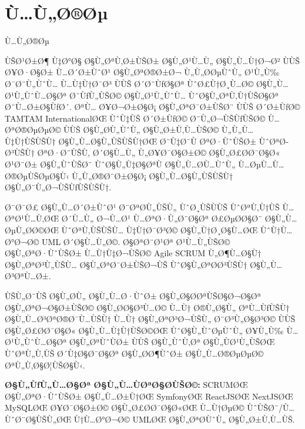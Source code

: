 \documentclass{rapportPFEHIND}
\begin{document}
\section*{Ù…Ù„Ø®Øµ}
\begin{RLtext}

\LARGE{Ù…Ù„Ø®Øµ}
\end{RLtext}
\begin{RLtext}

ÙŠØ¹Ø±Ø¶ Ù‡Ø°Ø§ Ø§Ù„ØªÙ‚Ø±ÙŠØ± Ø§Ù„Ø¹Ù…Ù„ Ø§Ù„Ù…Ù†Ø¬Ø² ÙÙŠ Ø¥Ø·Ø§Ø± Ù…Ø´Ø±ÙˆØ¹ Ø§Ù„ØªØ®Ø±Ø¬ Ù„Ù„Ø­ØµÙˆÙ„ Ø¹Ù„Ù‰ Ø¯Ø¨Ù„ÙˆÙ… Ù…Ù‡Ù†Ø¯Ø³ ÙÙŠ Ø´Ø¨ÙƒØ§Øª ÙˆØ£Ù†Ø¸Ù…Ø© Ø§Ù„Ù…Ø¹Ù„ÙˆÙ…Ø§Øª Ø¨ÙƒÙ„ÙŠØ© Ø§Ù„Ø¹Ù„ÙˆÙ… ÙˆØ§Ù„ØªÙ‚Ù†ÙŠØ§Øª Ø¨Ù…Ø±Ø§ÙƒØ´. ØªÙ… Ø¥Ø¬Ø±Ø§Ø¡ Ø§Ù„ØªØ¯Ø±ÙŠØ¨ ÙÙŠ Ø´Ø±ÙƒØ© TAMTAM InternationalØŒ ÙˆÙ‡ÙŠ Ø´Ø±ÙƒØ© Ø¨Ù„Ø¬ÙŠÙƒÙŠØ© Ù…ØªØ®ØµØµØ© ÙÙŠ Ø§Ù„Ø­Ù„ÙˆÙ„ Ø§Ù„Ø±Ù‚Ù…ÙŠØ© Ù„Ù„Ù…Ù‡Ù†ÙŠÙŠÙ† Ø§Ù„Ù…Ø§Ù„ÙŠÙŠÙ†ØŒ Ø¨Ù‡Ø¯Ù ØªØ·ÙˆÙŠØ± ÙˆØªØ­Ø³ÙŠÙ† ØªØ·Ø¨ÙŠÙ‚ Ø´Ø§Ù…Ù„ Ù„Ø¥Ø¯Ø§Ø±Ø© Ø§Ù„Ø£Ø­Ø¯Ø§Ø« Ø¹Ø¨Ø± Ø§Ù„ÙˆÙŠØ¨ ÙˆØ§Ù„Ù‡Ø§ØªÙ Ø§Ù„Ù…Ø­Ù…ÙˆÙ„ Ù…ØµÙ…Ù… Ø®ØµÙŠØµØ§Ù‹ Ù„Ù„Ø®Ø¨Ø±Ø§Ø¡ Ø§Ù„Ù…Ø§Ù„ÙŠÙŠÙ† Ø§Ù„Ø¨Ù„Ø¬ÙŠÙƒÙŠÙŠÙ†.

Ø¨Ø¯Ø£ Ø§Ù„Ù…Ø´Ø±ÙˆØ¹ Ø¨ØªØ­Ù„ÙŠÙ„ ÙˆØ¸ÙŠÙÙŠ ÙˆØªÙ‚Ù†ÙŠ Ù…ØªØ¹Ù…Ù‚ØŒ Ø´Ù…Ù„ Ø¬Ù…Ø¹ Ù…ØªØ·Ù„Ø¨Ø§Øª Ø£ØµØ­Ø§Ø¨ Ø§Ù„Ù…ØµÙ„Ø­Ø©ØŒ ÙˆØªÙ‚ÙŠÙŠÙ… Ù‡Ù†Ø¯Ø³Ø© Ø§Ù„Ù†Ø¸Ø§Ù…ØŒ ÙˆÙ†Ù…Ø°Ø¬Ø© UML Ø´Ø§Ù…Ù„Ø©. Ø§ØªØ¨Ø¹Øª Ø¹Ù…Ù„ÙŠØ© Ø§Ù„ØªØ·ÙˆÙŠØ± Ù…Ù†Ù‡Ø¬ÙŠØ© Agile SCRUM Ù„Ø¶Ù…Ø§Ù† Ø§Ù„ØªØ³Ù„ÙŠÙ… Ø§Ù„ØªØ¯Ø±ÙŠØ¬ÙŠ ÙˆØ§Ù„ØªØ­Ø³ÙŠÙ† Ø§Ù„Ù…Ø³ØªÙ…Ø±.

ÙŠÙ„Ø¨ÙŠ Ø§Ù„Ø­Ù„ Ø§Ù„Ù…Ø·ÙˆØ± Ø§Ù„Ø§Ø­ØªÙŠØ§Ø¬Ø§Øª Ø§Ù„ØªØ¬Ø§Ø±ÙŠØ© Ø§Ù„Ø­Ø§Ø³Ù…Ø© Ù…Ù† Ø®Ù„Ø§Ù„ ØªÙ…ÙƒÙŠÙ† Ø§Ù„Ù…Ø³ØªØ®Ø¯Ù…ÙŠÙ† Ù…Ù† Ø§Ù„ØªØ³Ø¬ÙŠÙ„ Ø¨Ø³Ù„Ø§Ø³Ø© ÙÙŠ Ø§Ù„Ø£Ø­Ø¯Ø§Ø« Ø§Ù„Ù…Ù‡Ù†ÙŠØ©ØŒ ÙˆØ§Ù„ÙˆØµÙˆÙ„ Ø¥Ù„Ù‰ Ù…Ø¹Ù„ÙˆÙ…Ø§Øª Ø§Ù„ØªÙˆÙØ± ÙÙŠ Ø§Ù„ÙˆÙ‚Øª Ø§Ù„ÙØ¹Ù„ÙŠØŒ ÙˆØªÙ„Ù‚ÙŠ Ø´Ù‡Ø§Ø¯Ø§Øª Ø§Ù„Ø­Ø¶ÙˆØ± Ø§Ù„Ù…Ø®ØµØµØ© ØªÙ„Ù‚Ø§Ø¦ÙŠØ§Ù‹.

\vspace{3cm}
\textbf{Ø§Ù„ÙƒÙ„Ù…Ø§Øª Ø§Ù„Ù…ÙØªØ§Ø­ÙŠØ©:} SCRUMØŒ Ø§Ù„ØªØ·ÙˆÙŠØ± Ø§Ù„Ù…Ø±Ù†ØŒ SymfonyØŒ ReactJSØŒ NextJSØŒ MySQLØŒ Ø¥Ø¯Ø§Ø±Ø© Ø§Ù„Ø£Ø­Ø¯Ø§Ø«ØŒ Ù…Ù†ØµØ© ÙˆÙŠØ¨/Ù…ÙˆØ¨Ø§ÙŠÙ„ØŒ Ù†Ù…Ø°Ø¬Ø© UMLØŒ Ø§Ù„ØªØ­ÙˆÙ„ Ø§Ù„Ø±Ù‚Ù…ÙŠ.
\end{RLtext}

\newpage

\tableofcontents
\newpage

\listoffigures
{}
\newpage

\listoftables
{}
\newpage
\end{document}
